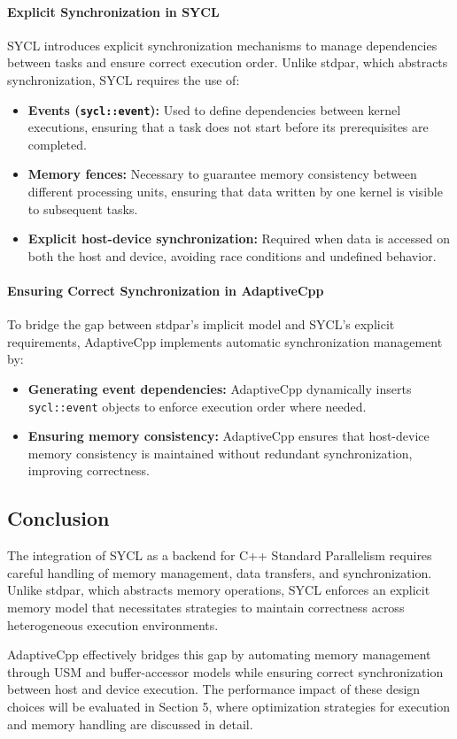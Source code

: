 \paragraph{Explicit Synchronization in SYCL}
SYCL introduces explicit synchronization mechanisms to manage dependencies between tasks and ensure correct
execution order. Unlike stdpar, which abstracts synchronization, SYCL requires the use of:
\begin{itemize}
    \item \textbf{Events (\texttt{sycl::event}):} Used to define dependencies between kernel executions,
    ensuring that a task does not start before its prerequisites are completed.
    \item \textbf{Memory fences:} Necessary to guarantee memory consistency between different processing units,
    ensuring that data written by one kernel is visible to subsequent tasks.
    \item \textbf{Explicit host-device synchronization:} Required when data is accessed on both the host and
    device, avoiding race conditions and undefined behavior.
\end{itemize}

\paragraph{Ensuring Correct Synchronization in AdaptiveCpp}
To bridge the gap between stdpar’s implicit model and SYCL’s explicit requirements, AdaptiveCpp implements
automatic synchronization management by:
\begin{itemize}
    \item \textbf{Generating event dependencies:} AdaptiveCpp dynamically inserts \texttt{sycl::event} objects
    to enforce execution order where needed.
    \item \textbf{Ensuring memory consistency:} AdaptiveCpp ensures that host-device memory consistency is
    maintained without redundant synchronization, improving correctness.
\end{itemize}

\subsection{Conclusion}
\label{sec:memory_conclusion}

The integration of SYCL as a backend for C++ Standard Parallelism requires careful handling of memory management,
data transfers, and synchronization. Unlike stdpar, which abstracts memory operations, SYCL enforces an explicit
memory model that necessitates strategies to maintain correctness across heterogeneous execution environments.

AdaptiveCpp effectively bridges this gap by automating memory management through USM and buffer-accessor
models while ensuring correct synchronization between host and device execution. The performance impact of
these design choices will be evaluated in Section 5, where optimization strategies for execution and memory
handling are discussed in detail.
